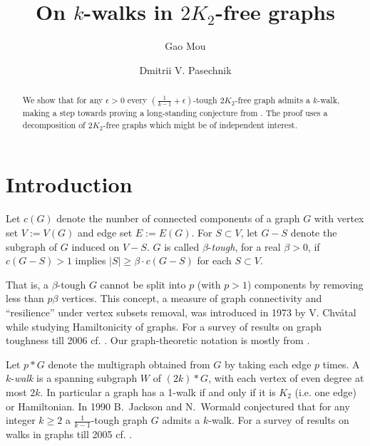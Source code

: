 \documentclass{amsart}
\theoremstyle{definition}
\newtheorem{definition}{Definition}
\newcommand{\ncc}{c}
\begin{document}
\author{Gao Mou}
\address{School of Physical and Mathematical Sciences, Nanyang Technological University, Singapore} 
\author{Dmitrii V. Pasechnik}
\address{Department of Computer Science, The University of Oxford, UK}

\title{On $k$-walks in $2K_2$-free graphs}
\begin{abstract}
We show that for any $\epsilon>0$ every $(\frac{1}{k-1}+\epsilon)$-tough
$2K_2$-free graph admits a $k$-walk, making a step towards proving a
long-standing conjecture from \cite{jackson1990k}. The proof uses a
decomposition of $2K_2$-free graphs which might be of independent interest.
\end{abstract}

\maketitle

\section{Introduction}

Let  $\ncc(G)$ denote the number of connected components of a graph $G$ with vertex set $V:=V(G)$ and edge set $E:=E(G)$. For $S\subset V$, let $G-S$ denote the subgraph of $G$ induced on $V-S$.
$G$ is called $\beta$-{\em tough},
for a real $\beta>0$, if $\ncc(G-S)>1$ implies $|S|\ge \beta\cdot \ncc(G-S)$ 
for each $S\subset V$.

That is, a $\beta$-tough 
$G$ cannot be split into $p$ (with $p>1$) components by removing less than
$p\beta$ vertices.  
This concept, a measure of graph connectivity and ``resilience'' under vertex subsets removal,
was introduced in 1973 by V. Chv\'{a}tal 
while studying   Hamiltonicity of graphs. For a survey of results on graph toughness till 2006
cf. \cite{MR2221006}. Our graph-theoretic notation is mostly from \cite{bomu08}.

Let $p*G$ denote the multigraph obtained from $G$ by taking each edge $p$ times. 
A $k$-{\em walk} is a spanning subgraph $W$ of $(2k)*G$, with each vertex of even degree at 
most $2k$.%
In particular a graph has a 1-walk if and only if it is $K_2$ (i.e. one edge) or Hamiltonian.
In 1990 B.~Jackson and N.~Wormald conjectured \cite{jackson1990k} that for any integer $k\ge2$ a
$\frac{1}{k-1}$-tough graph $G$ admits a $k$-walk.
{For a survey of results on walks in graphs till 2005 cf. \cite{kouider2005connected}.}
\end{document}
